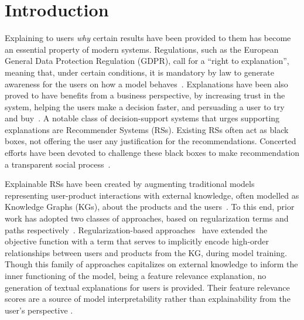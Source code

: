 \documentclass[sigconf]{acmart}
\begin{document}


\maketitle

\section{Introduction}

\vspace{1mm}  
Explaining to users {\em why} certain results have been provided to them has become an essential property of modern systems. 
Regulations, such as the European General Data Protection Regulation (GDPR), call for a ``right to explanation'', meaning that, under certain conditions, it is mandatory by law to generate awareness for the users on how a model behaves~\cite{GoodmanF17}. 
Explanations have been also proved to have benefits from a business perspective, by increasing trust in the system, helping the users make a decision faster, and persuading a user to try and buy~\cite{Tintarev2007}.
A notable class of decision-support systems that urges supporting explanations are Recommender Systems (RSs). 
Existing RSs often act as black boxes, not offering the user any justification for the recommendations.
Concerted efforts have been devoted to challenge these black boxes to make recommendation a transparent social process~\cite{XianFMMZ19}.

\vspace{1mm}  
Explainable RSs have been created by augmenting traditional models representing user-product interactions with external knowledge, often modelled as Knowledge Graphs (KGs), about the products and the users~\cite{cao-etal-2018-neural, 10.1145/2926718}. 
To this end, prior work has adopted two classes of approaches, based on regularization terms and paths respectively~\cite{arrieta2019explainable}.  
Regularization-based approaches~\cite{CaoWHHC19, CKE10.1145/2939672.2939673, XianFMMZ19, BordesUGWY13, 10.5555/2886521.2886624} have extended the objective function with a term that serves to implicitly encode high-order relationships between users and products from the KG, during model training. 
Though this family of approaches capitalizes on external knowledge to inform the inner functioning of the model, being a feature relevance explanation, no generation of textual explanations for users is provided. {\color{black}Their feature relevance scores are a source of model interpretability rather than explainability from the user's perspective \cite{electronics8080832}.}
\end{document}
